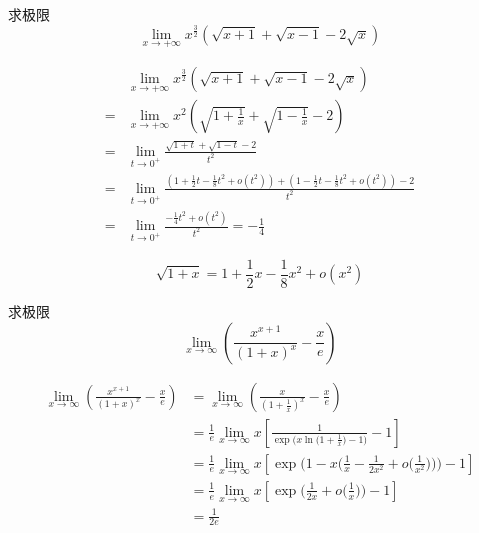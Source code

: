 \documentclass[color=green,titlestyle=hang]{elegantbook}%
\begin{document}
\begin{exercise}
求极限\[\lim_{x\to+\infty } {x^{\frac{3}{2}}}\left( {\sqrt {x + 1}  + \sqrt {x - 1}  - 2\sqrt x } \right)\]
\end{exercise}\begin{solution}\begin{align*}
&\lim\limits_{x \to  + \infty } {x^{\frac{3}{2}}}\left( {\sqrt {x + 1}  + \sqrt {x - 1}  - 2\sqrt x } \right)\\
=&\lim\limits_{x \to  + \infty }{x^2}\left( {\sqrt {1 + \frac{1}{x}}  + \sqrt {1 - \frac{1}{x}}  - 2} \right)\\
=&\lim\limits_{t \to {0^ + }} \frac{{\sqrt {1 + t}  + \sqrt {1 - t}  - 2}}{{{t^2}}}\\
=&\lim\limits_{t \to {0^ + }} \frac{{\left( {1 + \frac{1}{2}t - \frac{1}{8}{t^2} + o\left( {{t^2}} \right)} \right) + \left( {1 - \frac{1}{2}t - \frac{1}{8}{t^2} + o\left( {{t^2}} \right)} \right) - 2}}{{{t^2}}}\\
= &\lim\limits_{t \to {0^ + }} \frac{{ - \frac{1}{4}{t^2} + o\left( {{t^2}} \right)}}{{{t^2}}} =  - \frac{1}{4}
\end{align*}\begin{note}
	\[\sqrt {1 + x}  = 1 + \frac{1}{2}x - \frac{1}{8}{x^2} + o\left( {{x^2}} \right)\]
\end{note}	
\end{solution}

\begin{exercise}
求极限\[\lim_{x\to\infty}\left(\frac{x^{x+1}}{(1+x)^x}-\frac{x}{e}\right)\]
\end{exercise}\begin{solution}\begin{align*}\lim_{x\to\infty}\left(\frac{x^{x+1}}{(1+x)^x}-\frac{x}{e}\right)&=\lim_{x\to\infty}\left(\frac{x}{\left (1+\frac{1}{x}\right)^x}-\frac{x}{e}\right)\\
&=\frac{1}{e}\lim_{x\to\infty}x\left[\frac{1}{\exp\Big(x\ln\big(1+\frac{1}{x}\big)-1\Big)}-1\right]\\
&=\frac{1}{e}\lim_{x\to\infty}x\left[\exp\Biggl(1-x\biggl(\frac{1}{x}-\frac{1}{2x^2}+o\Big(\frac{1}{x^2}\Big)\biggl)\Biggl)-1\right]\\
&=\frac{1}{e}\lim_{x\to\infty}x\left[\exp\biggl(\frac{1}{2x}+o\Big(\frac{1}{x}\Big)\biggl)-1\right]\\
&=\frac{1}{2e}
\end{align*}
\end{solution}
\end{document}
